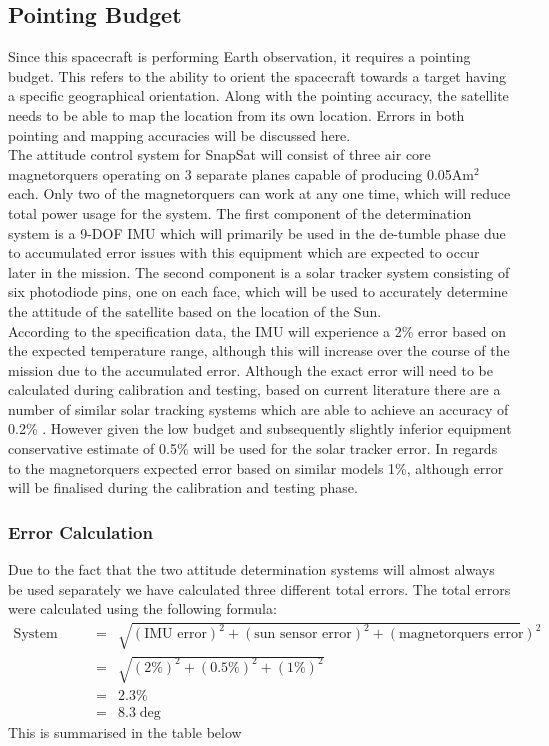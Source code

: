 \subsection{Pointing Budget}

Since this spacecraft is performing Earth observation, it requires a pointing budget. This refers to the ability to orient the spacecraft towards a target having a specific geographical orientation. Along with the pointing accuracy, the satellite needs to be able to map the location from its own location. Errors in both pointing and mapping accuracies will be discussed here. \\
\noindent
The attitude control system for SnapSat will consist of three air core magnetorquers operating on 3 separate planes capable of producing 0.05Am$^2$ each.  Only two of the magnetorquers can work at any one time, which will reduce total power usage for the system.  The first component of the determination system is a 9-DOF IMU which will primarily be used in the de-tumble phase due to accumulated error issues with this equipment which are expected to occur later in the mission.  The second component is a solar tracker system consisting of six photodiode pins, one on each face, which will be used to accurately determine the attitude of the satellite based on the location of the Sun. \\
\noindent
According to the specification data, the IMU will experience a 2\% error based on the expected temperature range, although this will increase over the course of the mission due to the accumulated error.  Although the exact error will need to be calculated during calibration and testing, based on current literature there are a number of similar solar tracking systems which are able to achieve an accuracy of 0.2\% \cite{beaudette}.  However given the low budget and subsequently slightly inferior equipment conservative estimate of 0.5\% will be used for the solar tracker error.  In regards to the magnetorquers expected error based on similar models 1\%, although error will be finalised during the calibration and testing phase.
\subsubsection{Error Calculation}
Due to the fact that the two attitude determination systems will almost always be used separately we have calculated three different total errors. The total errors were calculated using the following formula:
\begin{eqnarray}
\text{System Error} &=& \sqrt{(\text{IMU error})^2+(\text{sun sensor error})^2+(\text{magnetorquers error})^2} \\
&=& \sqrt{(2\%)^2+(0.5\%)^2+(1\%)^2} \\
&=& 2.3\% \\
&=& 8.3\deg
\end{eqnarray}
This is summarised in the table below

